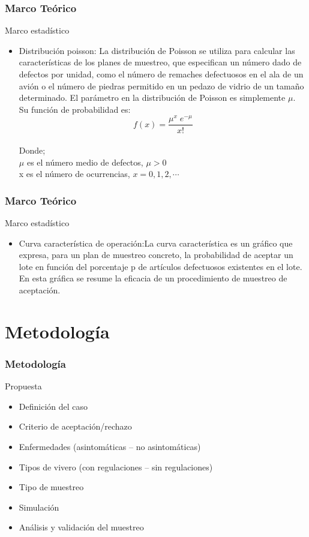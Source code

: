 \documentclass[10pt]{beamer}
\begin{document}
\begin{frame}
\frametitle{Marco Teórico}
\begin{block}{Marco estadístico}
\begin{itemize}
\justifying
\item Distribución poisson: La distribución de Poisson se utiliza para calcular las características de los planes de muestreo, que especifican un número dado de defectos por unidad, como el número de remaches defectuosos en el ala de un avión o el número de piedras permitido en un pedazo de vidrio de un tamaño determinado. El parámetro en la distribución de Poisson es simplemente $\mu$. Su función de probabilidad es:
$$f(x)=\frac{{\mu}^x \; e^{-\mu}}{x!}$$
~\\ Donde; 
~\\ $\mu$ es el número medio de defectos, $\mu>0$
~\\ x es el número de ocurrencias, $x=0,1,2,\cdots$
\end{itemize}
\end{block}
\end{frame}

\begin{frame}
\frametitle{Marco Teórico}
\begin{block}{Marco estadístico}
\begin{itemize}
\justifying
\item Curva característica de operación:La curva característica es un gráfico que expresa, para un plan de muestreo concreto, la probabilidad de aceptar un lote en función del porcentaje p de artículos defectuosos existentes en el lote. En esta gráfica se resume la eficacia de un procedimiento de muestreo de aceptación.
\end{itemize}
\end{block}
\end{frame}

\section{Metodología}
\begin{frame}
\frametitle{Metodología}
\begin{block}{Propuesta}
\begin{itemize}
\item Definición del caso
\item Criterio de aceptación/rechazo
\item Enfermedades (asintomáticas – no asintomáticas)
\item Tipos de vivero (con regulaciones – sin regulaciones)
\item Tipo de muestreo
\item Simulación
\item Análisis y validación del muestreo
\end{itemize}
\end{block}
\end{frame}
\end{document}

